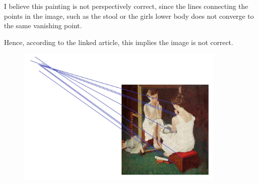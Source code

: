\documentclass[12pt, oneside]{article}
\begin{document}
I believe this painting is not perspectively correct, since the lines connecting
the points in the image, such as the stool or the girls lower body does not 
converge to the same vanishing point.

Hence, according to the linked article, this implies the image is not correct.

\begin{figure}[H]
    \includegraphics[width=0.90\textwidth]{imgs/girl_at_mirror}
  \end{figure}
\end{document}
